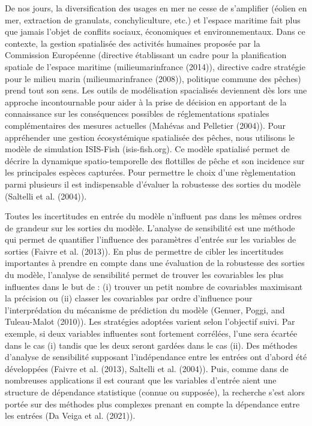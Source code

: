 \documentclass[
]{article}
\begin{document}
De nos jours, la diversification des usages en mer ne cesse de
s'amplifier (éolien en mer, extraction de granulats, conchyliculture,
etc.) et l'espace maritime fait plus que jamais l'objet de conflits
sociaux, économiques et environnementaux. Dans ce contexte, la gestion
spatialisée des activités humaines proposée par la Commission Européenne
(directive établissant un cadre pour la planification spatiale de
l'espace maritime (milieumarinfrance (2014)), directive cadre stratégie
pour le milieu marin (milieumarinfrance (2008)), politique commune des
pêches) prend tout son sens. Les outils de modélisation spacialisés
deviennent dès lors une approche incontournable pour aider à la prise de
décision en apportant de la connaissance sur les conséquences possibles
de réglementations spatiales complémentaires des mesures actuelles
(Mahévas and Pelletier (2004)). Pour appréhender une gestion
écosystémique spatialisée des pêches, nous utilisons le modèle de
simulation ISIS-Fish (isis-fish.org). Ce modèle spatialisé permet de
décrire la dynamique spatio-temporelle des flottilles de pêche et son
incidence sur les principales espèces capturées. Pour permettre le choix
d'une règlementation parmi plusieurs il est indispensable d'évaluer la
robustesse des sorties du modèle (Saltelli et al. (2004)).

Toutes les incertitudes en entrée du modèle n'influent pas dans les
mêmes ordres de grandeur sur les sorties du modèle. L'analyse de
sensibilité est une méthode qui permet de quantifier l'influence des
paramètres d'entrée sur les variables de sorties (Faivre et al. (2013)).
En plus de permettre de cibler les incertitudes importantes à prendre en
compte dans une évaluation de la robustesse des sorties du modèle,
l'analyse de sensibilité permet de trouver les covariables les plus
influentes dans le but de : (i) trouver un petit nombre de covariables
maximisant la précision ou (ii) classer les covariables par ordre
d'influence pour l'interprédation du mécanisme de prédiction du modèle
(Genuer, Poggi, and Tuleau-Malot (2010)). Les stratégies adoptées
varient selon l'objectif suivi. Par exemple, si deux variables
influentes sont fortement corrélées, l'une sera écartée dans le cas (i)
tandis que les deux seront gardées dans le cas (ii). Des méthodes
d'analyse de sensibilité supposant l'indépendance entre les entrées ont
d'abord été développées (Faivre et al. (2013), Saltelli et al. (2004)).
Puis, comme dans de nombreuses applications il est courant que les
variables d'entrée aient une structure de dépendance statistique (connue
ou supposée), la recherche s'est alors portée sur des méthodes plus
complexes prenant en compte la dépendance entre les entrées (Da Veiga et
al. (2021)).
\end{document}
